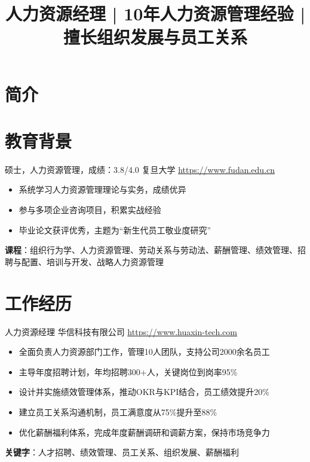 \documentclass[a4paper, serif, 10pt]{moderncv}
\title{人力资源经理 | 10年人力资源管理经验 | 擅长组织发展与员工关系}
\begin{document}
\maketitle

\section{简介}

\section{教育背景}

        {硕士，人力资源管理，成绩：3.8/4.0}
        {复旦大学}
        {\url{https://www.fudan.edu.cn}}
        {}
        {\begin{itemize}
\item 系统学习人力资源管理理论与实务，成绩优异
\item 参与多项企业咨询项目，积累实战经验
\item 毕业论文获评优秀，主题为“新生代员工敬业度研究”
\end{itemize}
\textbf{课程}：组织行为学、人力资源管理、劳动关系与劳动法、薪酬管理、绩效管理、招聘与配置、培训与开发、战略人力资源管理}
\section{工作经历}

        {人力资源经理}
        {华信科技有限公司}
        {\url{https://www.huaxin-tech.com}}
        {}
        {\begin{itemize}
\item 全面负责人力资源部门工作，管理10人团队，支持公司2000余名员工
\item 主导年度招聘计划，年均招聘300+人，关键岗位到岗率95\%
\item 设计并实施绩效管理体系，推动OKR与KPI结合，员工绩效提升20\%
\item 建立员工关系沟通机制，员工满意度从75\%提升至88\%
\item 优化薪酬福利体系，完成年度薪酬调研和调薪方案，保持市场竞争力
\end{itemize}
\textbf{关键字}：人才招聘、绩效管理、员工关系、组织发展、薪酬福利}
\end{document}
